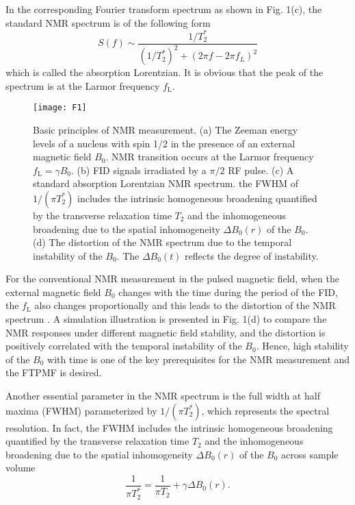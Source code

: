 \documentclass[lettersize,journal]{IEEEtran}
\begin{document}
In the corresponding Fourier transform spectrum as shown in Fig. 1(c), the standard NMR spectrum is of the following form
\begin{equation}
S\left( f \right) \sim \frac{1/T_{2}^{*}}{\left( 1/T_{2}^{*} \right) ^2+\left( 2\pi f-2\pi f_L \right) ^2}
\end{equation}
which is called the absorption Lorentzian. It is obvious that the peak of the spectrum is at the Larmor frequency $f_{\mathrm{L}}$.

\begin{figure}[t]
\centering
\texttt{[image: F1]}
\caption{Basic principles of NMR measurement. (a) The Zeeman energy levels of a nucleus with spin 1/2 in the presence of an external magnetic field $B_0$. NMR transition occurs at the Larmor frequency $f_{\mathrm{L}}=\gamma B_0$. (b) FID signals irradiated by a ${\pi /2}$ RF pulse. (c) A standard absorption Lorentzian NMR spectrum. the FWHM of $1/\left( \pi T_{2}^{*} \right)$ includes the intrinsic homogeneous broadening quantified by the transverse relaxation time $T_2$ and the inhomogeneous broadening due to the spatial inhomogeneity $\varDelta B_0\left( r \right)$ of the $B_0$. (d) The distortion of the NMR spectrum due to the temporal instability of the $B_0$. The $\varDelta B_0\left( t \right)$ reflects the degree of instability.}
\end{figure}

For the conventional NMR measurement in the pulsed magnetic field, when the external magnetic field $B_0$ changes with the time during the period of the FID, the $f_{\mathrm{L}}$ also changes proportionally and this leads to the distortion of the NMR spectrum \cite{ref8,ref15}. A simulation illustration is presented in Fig. 1(d) to compare the NMR responses under different magnetic field stability, and the distortion is positively correlated with the temporal instability of the $B_0$. Hence, high stability of the $B_0$ with time is one of the key prerequisites for the NMR measurement and the FTPMF is desired.

Another essential parameter in the NMR spectrum is the full width at half maxima (FWHM) parameterized by $1/\left( \pi T_{2}^{*} \right)$, which represents the spectral resolution. In fact, the FWHM includes the intrinsic homogeneous broadening quantified by the transverse relaxation time $T_2$ and the inhomogeneous broadening due to the spatial inhomogeneity $\varDelta B_0\left( r \right)$ of the $B_0$ across sample volume \cite{chavhan2009principles}
\begin{equation}
\frac{1}{\pi T_{2}^{*}}=\frac{1}{\pi T_2}+\gamma \varDelta B_0\left( r \right).
\end{equation}
\end{document}
